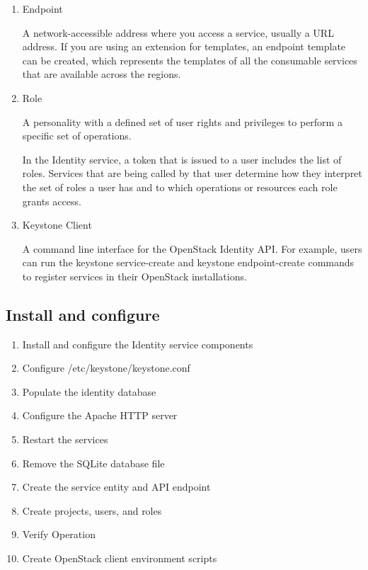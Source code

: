\begin{enumerate}
        \item Endpoint
        \par A network-accessible address where you access a service, usually a URL address. If you are using an extension for templates, an endpoint template can be created, which represents the templates of all the consumable services that are available across the regions.
        
        \item Role
        \par A personality with a defined set of user rights and privileges to perform a specific set of operations.
        
        \par In the Identity service, a token that is issued to a user includes the list of roles. Services that are being called by that user determine how they interpret the set of roles a user has and to which operations or resources each role grants access.
        
        \item Keystone Client
        \par A command line interface for the OpenStack Identity API. For example, users can run the keystone service-create and keystone endpoint-create commands to register services in their OpenStack installations.

    \end{enumerate}
    
    \subsection{Install and configure}
        \begin{enumerate}
            \item Install and configure the Identity service components
            \item Configure /etc/keystone/keystone.conf
            \item Populate the identity database
            \item Configure the Apache HTTP server
            \item Restart the services
            \item Remove the SQLite database file
            \item Create the service entity and API endpoint
            \item Create projects, users, and roles
            \item Verify Operation
            \item Create OpenStack client environment scripts
        \end{enumerate}
    


